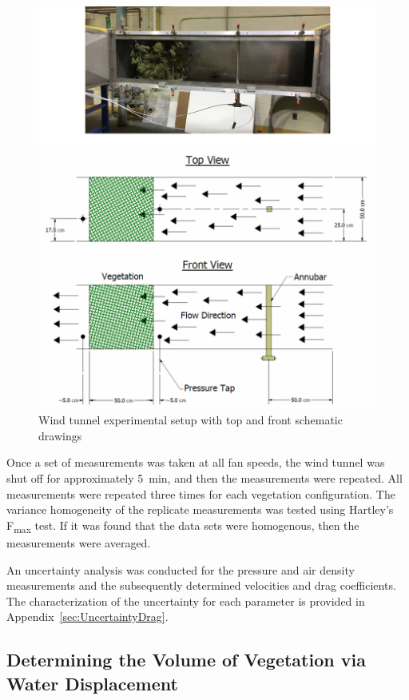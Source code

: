 \documentclass[12pt]{article}
\begin{document}
\begin{figure} [!]
	\centering
    \includegraphics[width=\textwidth,keepaspectratio]{Picture6a.png}
	\caption[Wind tunnel experimental setup]{Wind tunnel experimental setup with top and front schematic drawings }
	\label{fig:WindtunnelPic}
\end{figure}

Once a set of measurements was taken at all fan speeds, the wind tunnel was shut off for approximately 5~\si{min}, and then the measurements were repeated. All measurements were repeated three times for each vegetation configuration. The variance homogeneity of the replicate measurements was tested using Hartley's F\textsubscript{max} test. If it was found that the data sets were homogenous, then the measurements were averaged.

An uncertainty analysis was conducted for the pressure and air density measurements and the subsequently determined velocities and drag coefficients. The characterization of the uncertainty for each parameter is provided in Appendix~\ref{sec:UncertaintyDrag}.

\subsection{Determining the Volume of Vegetation via Water Displacement}
\label{ssec:waterdisp}
\end{document}
